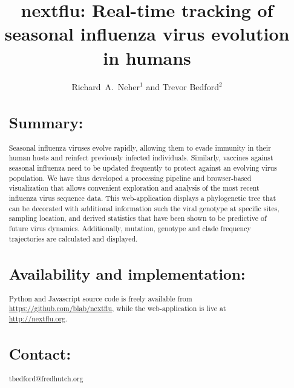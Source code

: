 \documentclass{bioinfo}
\begin{document}
\title[Tracking of seasonal influenza virus evolution]{nextflu: Real-time tracking of seasonal influenza virus evolution in humans}
\author{Richard~A.~Neher$^{1}$ and Trevor Bedford$^{2}$}
\address{$^{1}$Max Planck Institute for Developmental Biology, 72076 T\"ubingen, Germany, and $^{2}$Vaccine and Infectious Disease Division, Fred Hutchinson Cancer Research Center, Seattle, WA 98109, USA}


\maketitle



\begin{abstract} \section{Summary:} Seasonal influenza viruses evolve rapidly, allowing them to evade immunity in their human hosts and reinfect previously infected individuals.
Similarly, vaccines against seasonal influenza need to be updated frequently to protect against an evolving virus population.
We have thus developed a processing pipeline and browser-based visualization that allows convenient exploration and analysis of the most recent influenza virus sequence data.
This web-application displays a phylogenetic tree that can be decorated with additional information such the viral genotype at specific sites, sampling location, and derived statistics that have been shown to be predictive of future virus dynamics.
Additionally, mutation, genotype and clade frequency trajectories are calculated and displayed.

\section{Availability and implementation:} Python and Javascript source code is freely available from \url{https://github.com/blab/nextflu}, while the web-application is live at \url{http://nextflu.org}.

\section{Contact:} tbedford@fredhutch.org

\end{abstract}
\end{document}
